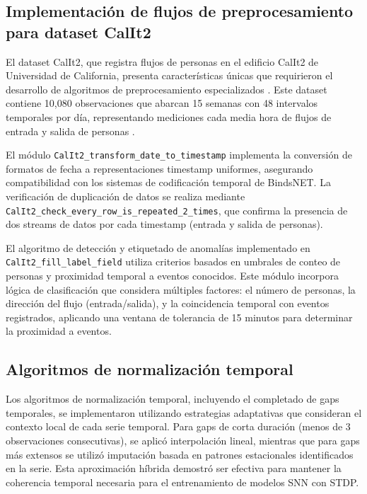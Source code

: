\subsection{Implementación de flujos de preprocesamiento para dataset CalIt2}

El dataset CalIt2, que registra flujos de personas en el edificio CalIt2 de Universidad de California, presenta características únicas que requirieron el desarrollo de algoritmos de preprocesamiento especializados \cite{UCI_Calit2_2009}. Este dataset contiene 10,080 observaciones que abarcan 15 semanas con 48 intervalos temporales por día, representando mediciones cada media hora de flujos de entrada y salida de personas \cite{UCI_Calit2_2009}.

El módulo \texttt{CalIt2\_transform\_date\_to\_timestamp} implementa la conversión de formatos de fecha a representaciones timestamp uniformes, asegurando compatibilidad con los sistemas de codificación temporal de BindsNET. La verificación de duplicación de datos se realiza mediante \texttt{CalIt2\_check\_every\_row\_is\_repeated\_2\_times}, que confirma la presencia de dos streams de datos por cada timestamp (entrada y salida de personas). 

El algoritmo de detección y etiquetado de anomalías implementado en \texttt{CalIt2\_fill\_label\_field} utiliza criterios basados en umbrales de conteo de personas y proximidad temporal a eventos conocidos. Este módulo incorpora lógica de clasificación que considera múltiples factores: el número de personas, la dirección del flujo (entrada/salida), y la coincidencia temporal con eventos registrados, aplicando una ventana de tolerancia de 15 minutos para determinar la proximidad a eventos. 

\subsection{Algoritmos de normalización temporal}

Los algoritmos de normalización temporal, incluyendo el completado de gaps temporales, se implementaron utilizando estrategias adaptativas que consideran el contexto local de cada serie temporal. Para gaps de corta duración (menos de 3 observaciones consecutivas), se aplicó interpolación lineal, mientras que para gaps más extensos se utilizó imputación basada en patrones estacionales identificados en la serie. Esta aproximación híbrida demostró ser efectiva para mantener la coherencia temporal necesaria para el entrenamiento de modelos SNN con STDP.

